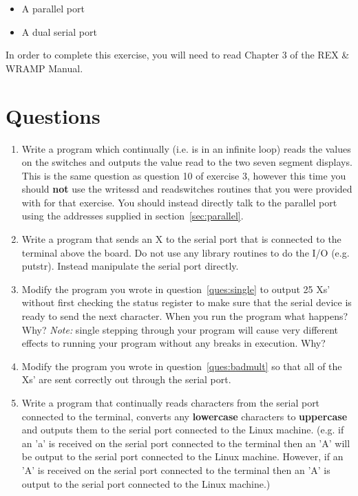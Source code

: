 \documentclass[a4paper,10pt]{article}
\begin{document}
\begin{itemize}
\item A parallel port
\item A dual serial port
\end{itemize}

In order to complete this exercise, you will need to read Chapter 3 of the REX \& WRAMP Manual.

\section{Questions}

\begin{enumerate}

\item Write a program which continually (i.e. is in an infinite loop)
reads the values on the switches and outputs the value read to the two
seven segment displays. This is the same question as question 10 of
exercise 3, however this time you should \textbf{not} use the writessd
and readswitches routines that you were provided with for that
exercise. You should instead directly talk to the parallel port using
the addresses supplied in section~\ref{sec:parallel}.

\item 
\label{ques:single}

Write a program that sends an X to the serial port that is
connected to the terminal above the board. Do not use any library
routines to do the I/O (e.g. putstr). Instead manipulate the serial
port directly.

\item 
\label{ques:badmult}
Modify the program you wrote in question~\ref{ques:single} to output
25 Xs' without first checking the status register to make sure that
the serial device is ready to send the next character. When you run
the program what happens?  Why? \textit{Note:} single stepping through
your program will cause very different effects to running your program
without any breaks in execution. Why?

\item Modify the program you wrote in question~\ref{ques:badmult} so
that all of the Xs' are sent correctly out through the serial port.

\item 
\label{ques:upperlower}
Write a program that continually reads characters from the serial port
connected to the terminal, converts any \textbf{lowercase} characters
to \textbf{uppercase} and outputs them to the serial port connected to
the Linux machine. (e.g. if an 'a' is received on the serial port
connected to the terminal then an 'A' will be output to the serial
port connected to the Linux machine. However, if an 'A' is received on
the serial port connected to the terminal then an 'A' is output to the
serial port connected to the Linux machine.)


\end{enumerate}
\end{document}
